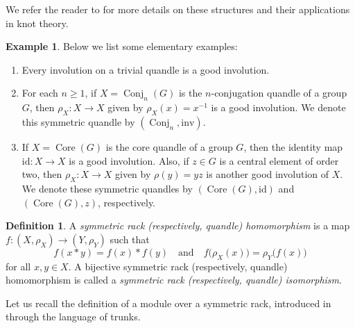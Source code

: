 \documentclass[11pt,reqno]{amsart}
\theoremstyle{definition}
\newtheorem{definition}[theorem]{Definition}
\newtheorem{example}[theorem]{Example}
\numberwithin{equation}{subsection}
\newcommand{\Conj}{\operatorname{Conj}}
\newcommand{\Core}{\operatorname{Core}}
\newcommand{\id}{\mathrm{id}}
\begin{document}
We refer the reader to \cite{MR2371714,MR3363811, MR2657689,MR4594919} for more details on these structures and their applications in knot theory.

\begin{example}
Below we list some elementary examples:
\begin{enumerate}
\item Every involution on a trivial quandle is a good involution.
\item For each $n \ge 1$, if $X= \Conj_n(G)$ is the $n$-conjugation quandle of a group $G$, then $\rho_X:X \rightarrow X$  given by $\rho_X(x)=x^{-1}$ is a good involution. We denote this symmetric quandle by $(\Conj_n,\mathrm{inv}).$
			\item If $X= \Core(G)$ is the core quandle of a group $G$, then the identity map $\id:X \rightarrow X$ is a good involution. Also, if $z \in G$ is a central element of order two, then $\rho_X:X \rightarrow X$ given by $\rho(y)=y z$ is another good involution of $X$. We denote these symmetric quandles by $(\Core(G),\id)$ and $(\Core(G),z)$, respectively.
		\end{enumerate}
	\end{example}	
	
\begin{definition}
A \textit{symmetric rack (respectively, quandle) homomorphism} is a map $f:(X,\rho_X) \rightarrow (Y, \rho_Y)$ such that 
$$f(x \ast y)=f(x) \ast f(y) \quad \textrm{and} \quad f \big(\rho_X(x) \big)=\rho_Y \big(f(x) \big)$$ for all $x,y \in X$. A bijective symmetric rack (respectively, quandle) homomorphism is called a \textit{symmetric rack (respectively, quandle) isomorphism}.
	\end{definition}
	
Let us recall the definition of a module over a symmetric rack, introduced in \cite[Definition 3.1]{KSS2024} through the language of trunks. 
\end{document}
